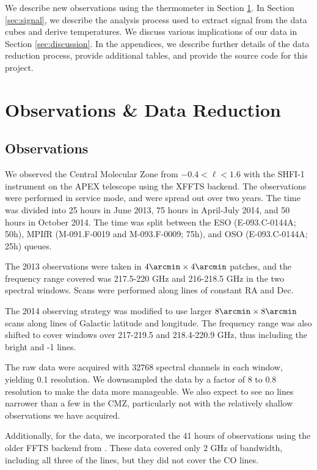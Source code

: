 We describe new observations using the \para thermometer in Section
\ref{sec:observations}.  In Section \ref{sec:signal}, we describe the analysis
process used to extract signal from the data cubes and derive temperatures.  We
discuss various implications of our data in Section \ref{sec:discussion}.  In
the appendices, we describe further details of the data reduction process,
provide additional tables, and provide the source code for this project.


\section{Observations \& Data Reduction}
\label{sec:observations}

\subsection{Observations}
We observed the Central Molecular Zone from $-0.4 < \ell < 1.6$ with the SHFI-1
instrument \citep{Vassilev2008a} on the APEX telescope using the XFFTS backend.
The observations were performed in service mode, and were spread out over two
years.  The time was divided into 25 hours in June 2013, 75 hours in April-July
2014, and 50 hours in October 2014.  The time was split between the ESO
(E-093.C-0144A; 50h), MPIfR (M-091.F-0019 and M-093.F-0009; 75h), and OSO
(E-093.C-0144A; 25h) queues.

The 2013 observations were taken in $4\arcmin \times 4\arcmin$ patches, and the
frequency range covered was 217.5-220 GHz and 216-218.5 GHz in the two spectral
windows.  Scans were performed along lines of constant RA and Dec.

The 2014 observing strategy was modified to use larger $8\arcmin \times
8\arcmin$ scans along lines of Galactic latitude and longitude.  The frequency
range was also shifted to cover windows over 217-219.5 and 218.4-220.9 GHz, thus
including the bright \thirteenco and -1 lines.


The raw data were acquired with 32768 spectral channels in each window, yielding
0.1 \kms resolution.  We downsampled the data by a factor of 8 to 0.8 \kms
resolution to make the data more manageable.  We also expect to see no lines
narrower than a few \kms in the CMZ, particularly not with the relatively
shallow observations we have acquired.

Additionally, for the \para data, we incorporated the 41 hours of observations
using the older FFTS backend from \citet{Ao2013a}.  These data covered only 2
GHz of bandwidth, including all three of the \para lines, but they did not
cover the CO lines.


